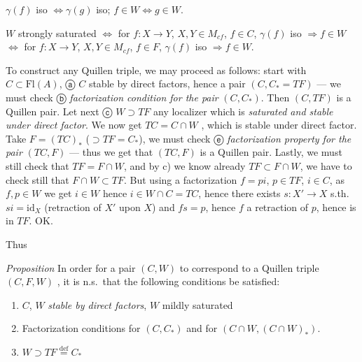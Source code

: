 \documentclass[11pt,a4paper]{article}
\begin{document}

$\gamma(f)$ iso $\Longleftrightarrow \gamma(g)$ iso; \quad
$f \in W \Longleftrightarrow g \in W$.

$W$ strongly saturated $\Longleftrightarrow$ for $f : X \to Y$,
$X, Y \in M_{cf}$, $f \in C$, $\gamma(f)$ iso $\Rightarrow f \in W$
$\Longleftrightarrow$ for $f : X \to Y$, $X, Y \in M_{cf}$, $f \in F$,
$\gamma(f)$ iso $\Rightarrow f \in W$.

To construct any Quillen triple, we may proceed as follows: start with
 $C \subset \mathrm{Fl}(A)$, ⓐ $C$ stable \struck{\ill{}}
by direct factors, hence a pair $(C, C_* = TF)$ — we must check ⓑ
\emph{factorization condition for the pair} $(C, C_*)$.  Then
$(C, TF)$ is a Quillen pair. Let next ⓒ $\boxed{W \supset TF}$ any
localizer which is  \emph{saturated and stable
under direct factor}. We now get $TC = C \cap W$ , which is
\struck{\ill{}} stable under direct factor. Take $F = (TC)_*$
($\supset TF = C_*$), we must check ⓔ \emph{factorization property for the
pair} $(TC, F)$ — thus we get that $(TC, F)$ is a Quillen pair. Lastly, we
must still check that $TF = F \cap W$, and by c) we know already
$TF \subset F \cap W$, we have to check still that $F \cap W \subset TF$.
But using a factorization $f = pi$, $p \in TF$, $i \in C$, as
$f, p \in W$ we get $i \in W$ hence $i \in W \cap C = TC$, hence there
exists $s : X' \to X$ s.th.\ $si = \mathrm{id}_X$ (retraction of $X'$ upon
$X$) and $fs = p$, hence $f$ a retraction of $p$, hence is in $TF$. OK.



Thus

\emph{Proposition} In order for a pair $(C, W)$ to correspond to a Quillen
triple $(C, F, W)$ , it is n.s.\ that the following
conditions be satisfied:
\begin{enumerate}
  \item[1)] $C$, $W$ \emph{stable by direct factors}, $W$ mildly saturated
  \item[2)] Factorization conditions for $(C, C_*)$ and for
  $(C \cap W, (C \cap W)_*)$.
  \item[3)] $W \supset TF \overset{\text{def}}{=} C_*$
\end{enumerate}
\end{document}
